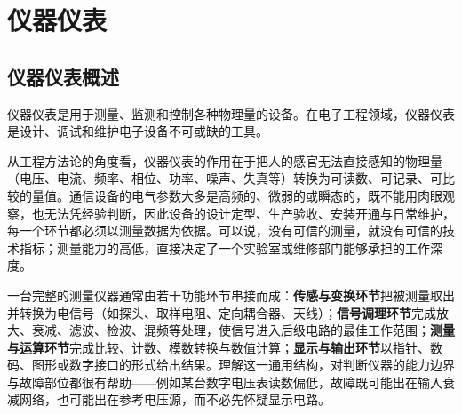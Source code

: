 
\chapter{仪器仪表}
\label{chap:instruments}

\section{仪器仪表概述}
\label{sec:instruments_intro}

仪器仪表是用于测量、监测和控制各种物理量的设备。在电子工程领域，仪器仪表是设计、调试和维护电子设备不可或缺的工具。

从工程方法论的角度看，仪器仪表的作用在于把人的感官无法直接感知的物理量（电压、电流、频率、相位、功率、噪声、失真等）转换为可读数、可记录、可比较的量值。通信设备的电气参数大多是高频的、微弱的或瞬态的，既不能用肉眼观察，也无法凭经验判断，因此设备的设计定型、生产验收、安装开通与日常维护，每一个环节都必须以测量数据为依据。可以说，没有可信的测量，就没有可信的技术指标；测量能力的高低，直接决定了一个实验室或维修部门能够承担的工作深度。

一台完整的测量仪器通常由若干功能环节串接而成：\textbf{传感与变换环节}把被测量取出并转换为电信号（如探头、取样电阻、定向耦合器、天线）；\textbf{信号调理环节}完成放大、衰减、滤波、检波、混频等处理，使信号进入后级电路的最佳工作范围；\textbf{测量与运算环节}完成比较、计数、模数转换与数值计算；\textbf{显示与输出环节}以指针、数码、图形或数字接口的形式给出结果。理解这一通用结构，对判断仪器的能力边界与故障部位都很有帮助——例如某台数字电压表读数偏低，故障既可能出在输入衰减网络，也可能出在参考电压源，而不必先怀疑显示电路。

